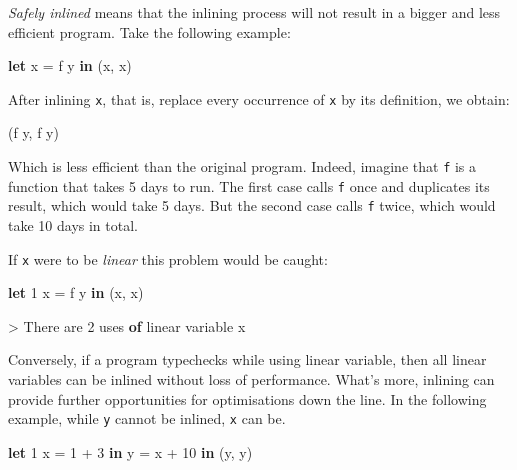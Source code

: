 \documentclass[
]{article}
\newenvironment{Shaded}{}{}
\newcommand{\DataTypeTok}[1]{\textcolor[rgb]{0.56,0.13,0.00}{#1}}
\newcommand{\DecValTok}[1]{\textcolor[rgb]{0.25,0.63,0.44}{#1}}
\newcommand{\KeywordTok}[1]{\textcolor[rgb]{0.00,0.44,0.13}{\textbf{#1}}}
\newcommand{\NormalTok}[1]{#1}
\newcommand{\OperatorTok}[1]{\textcolor[rgb]{0.40,0.40,0.40}{#1}}
\newcommand{\OtherTok}[1]{\textcolor[rgb]{0.00,0.44,0.13}{#1}}
\begin{document}
\emph{Safely inlined} means that the inlining process will not result in
a bigger and less efficient program. Take the following example:

\begin{Shaded}
\begin{Highlighting}[]
\KeywordTok{let}\NormalTok{ x }\OtherTok{=}\NormalTok{ f y }\KeywordTok{in}
\NormalTok{    (x, x)}
\end{Highlighting}
\end{Shaded}

After inlining \texttt{x}, that is, replace every occurrence of
\texttt{x} by its definition, we obtain:

\begin{Shaded}
\begin{Highlighting}[]
\NormalTok{(f y, f y)}
\end{Highlighting}
\end{Shaded}

Which is less efficient than the original program. Indeed, imagine that
\texttt{f} is a function that takes 5 days to run. The first case calls
\texttt{f} once and duplicates its result, which would take 5 days. But
the second case calls \texttt{f} twice, which would take 10 days in
total.

If \texttt{x} were to be \emph{linear} this problem would be caught:

\begin{Shaded}
\begin{Highlighting}[]
\KeywordTok{let} \DecValTok{1}\NormalTok{ x }\OtherTok{=}\NormalTok{ f y }\KeywordTok{in}
\NormalTok{    (x, x)}
\end{Highlighting}
\end{Shaded}

\begin{Shaded}
\begin{Highlighting}[]
\OperatorTok{\textgreater{}} \DataTypeTok{There}\NormalTok{ are }\DecValTok{2}\NormalTok{ uses }\KeywordTok{of}\NormalTok{ linear variable x}
\end{Highlighting}
\end{Shaded}

Conversely, if a program typechecks while using linear variable, then
all linear variables can be inlined without loss of performance. What's
more, inlining can provide further opportunities for optimisations down
the line. In the following example, while \texttt{y} cannot be inlined,
\texttt{x} can be.

\begin{Shaded}
\begin{Highlighting}[]
\KeywordTok{let} \DecValTok{1}\NormalTok{ x }\OtherTok{=} \DecValTok{1} \OperatorTok{+} \DecValTok{3} \KeywordTok{in}
\NormalTok{    y }\OtherTok{=}\NormalTok{ x }\OperatorTok{+} \DecValTok{10} \KeywordTok{in}
\NormalTok{    (y, y)}
\end{Highlighting}
\end{Shaded}
\end{document}
